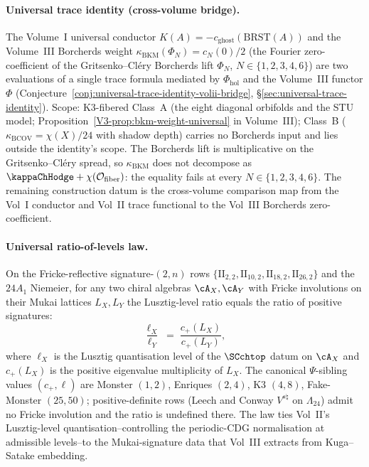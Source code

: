 \paragraph{Universal trace identity (cross-volume bridge).}
The Volume~I universal conductor
$K(A) = -c_{\mathrm{ghost}}(\mathrm{BRST}(A))$ and the
Volume~III Borcherds weight
$\kappa_{\mathrm{BKM}}(\Phi_N) = c_N(0)/2$
(the Fourier zero-coefficient of the Gritsenko--Cl\'ery Borcherds
lift $\Phi_N$, $N \in \{1, 2, 3, 4, 6\}$) are two evaluations of a
single trace formula mediated by $\Phi_{\mathrm{hol}}$ and the
Volume~III functor $\Phi$
(Conjecture~\ref{conj:universal-trace-identity-volii-bridge},
\S\ref{sec:universal-trace-identity}). Scope: K3-fibered
Class~A (the eight diagonal orbifolds and the STU model;
Proposition~\ref{V3-prop:bkm-weight-universal} in Volume~III);
Class~B ($\kappa_{\mathrm{BCOV}} = \chi(X)/24$ with shadow depth)
carries no Borcherds input and lies outside the identity's scope.
The Borcherds lift is multiplicative on the Gritsenko--Cl\'ery
spread, so $\kappa_{\mathrm{BKM}}$ does not decompose as
$\kappaChHodge + \chi(\mathcal{O}_{\mathrm{fiber}})$:
the equality fails at every $N \in \{1, 2, 3, 4, 6\}$.
The remaining construction datum is the cross-volume comparison map
from the Vol~I conductor and Vol~II trace functional to the Vol~III
Borcherds zero-coefficient.

\paragraph{Universal ratio-of-levels law.}
On the Fricke-reflective signature-$(2,n)$ rows
$\{\mathrm{II}_{2,2}, \mathrm{II}_{10,2}, \mathrm{II}_{18,2},
\mathrm{II}_{26,2}\}$ and the $24A_1$ Niemeier, for any two
chiral algebras $\cA_X, \cA_Y$ with Fricke involutions on
their Mukai lattices $L_X, L_Y$ the Lusztig-level ratio
equals the ratio of positive signatures:
\[
 \frac{\ell_X}{\ell_Y}
 \;=\;
 \frac{c_+(L_X)}{c_+(L_Y)},
\]
where $\ell_X$ is the Lusztig quantisation level of the
$\SCchtop$ datum on $\cA_X$ and $c_+(L_X)$ is the positive
eigenvalue multiplicity of $L_X$. The canonical $\Psi$-sibling
values $(c_+, \ell)$ are Monster $(1,2)$, Enriques $(2,4)$,
K3 $(4,8)$, Fake-Monster $(25,50)$; positive-definite rows
(Leech and Conway $V^{s\natural}$ on $\Lambda_{24}$) admit no
Fricke involution and the ratio is undefined there. The law
ties Vol~II's Lusztig-level quantisation--controlling the
periodic-CDG normalisation at admissible levels--to the
Mukai-signature data that Vol~III extracts from Kuga--Satake
embedding.


